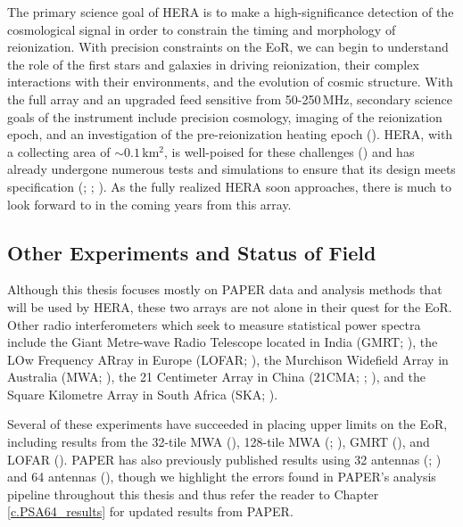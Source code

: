 The primary science goal of HERA is to make a high-significance detection of the cosmological signal in order to constrain the timing and morphology of reionization. With precision constraints on the EoR, we can begin to understand the role of the first stars and galaxies in driving reionization, their complex interactions with their environments, and the evolution of cosmic structure. With the full array and an upgraded feed sensitive from 50-250\,MHz, secondary science goals of the instrument include precision cosmology, imaging of the reionization epoch, and an investigation of the pre-reionization heating epoch (\citealt{deboer_et_al2017}). HERA, with a collecting area of $\sim0.1$\,km$^{2}$, is well-poised for these challenges (\citealt{pober_et_al2014}) and has already undergone numerous tests and simulations to ensure that its design meets specification (\citealt{neben_et_al2016}; \citealt{ewall-wice_et_al2017}; \citealt{patra_et_al2018}). As the fully realized HERA soon approaches, there is much to look forward to in the coming years from this array.

\subsection{Other Experiments and Status of Field}

Although this thesis focuses mostly on PAPER data and analysis methods that will be used by HERA, these two arrays are not alone in their quest for the EoR. Other radio interferometers which seek to measure statistical power spectra include the Giant Metre-wave Radio Telescope located in India (GMRT; \citealt{paciga_et_al2013}), the LOw Frequency ARray in Europe (LOFAR; \citealt{van_haarlem_et_al2013}), the Murchison Widefield Array in Australia (MWA; \citealt{tingay_et_al2013}), the 21 Centimeter Array in China (21CMA; \citealt{peterson_et_al2004}; \citealt{wu2009}), and the Square Kilometre Array in South Africa (SKA; \citealt{koopmans_et_al2015}).

Several of these experiments have succeeded in placing upper limits on the EoR, including results from the 32-tile MWA (\citealt{dillon_et_al2014}), 128-tile MWA (\citealt{dillon_et_al2015}; \citealt{beardsley_et_al2016}), GMRT (\citealt{paciga_et_al2013}), and LOFAR (\citealt{patil_et_al2017}). PAPER has also previously published results using 32 antennas (\citealt{parsons_et_al2014}; \citealt{jacobs_et_al2015}) and 64 antennas (\citealt{ali_et_al2015}), though we highlight the errors found in PAPER's analysis pipeline throughout this thesis and thus refer the reader to Chapter \ref{c.PSA64_results} for updated results from PAPER.

